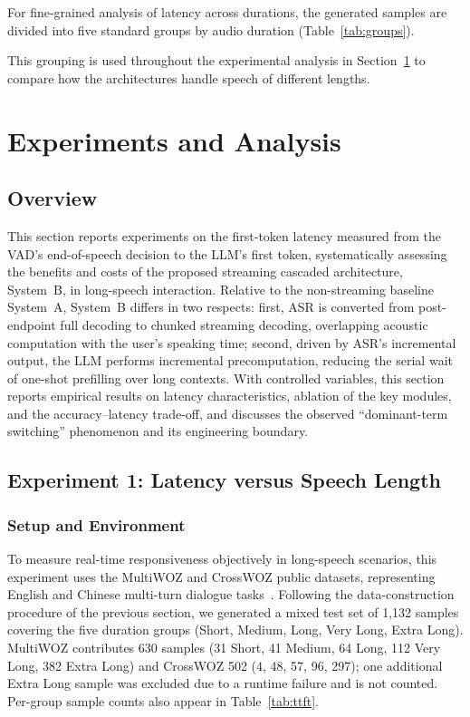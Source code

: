 \documentclass[pdflatex,iicol,Numbered,sn-basic]{sn-jnl}%
\begin{document}
For fine-grained analysis of latency across durations, the generated samples are divided into five standard groups by audio duration (Table~\ref{tab:groups}).

This grouping is used throughout the experimental analysis in Section~\ref{sec:experiments} to compare how the architectures handle speech of different lengths.

\section{Experiments and Analysis}\label{sec:experiments}

\subsection{Overview}

This section reports experiments on the first-token latency measured from the VAD's end-of-speech decision to the LLM's first token, systematically assessing the benefits and costs of the proposed streaming cascaded architecture, System~B, in long-speech interaction. Relative to the non-streaming baseline System~A, System~B differs in two respects: first, ASR is converted from post-endpoint full decoding to chunked streaming decoding, overlapping acoustic computation with the user's speaking time; second, driven by ASR's incremental output, the LLM performs incremental precomputation, reducing the serial wait of one-shot prefilling over long contexts. With controlled variables, this section reports empirical results on latency characteristics, ablation of the key modules, and the accuracy--latency trade-off, and discusses the observed ``dominant-term switching'' phenomenon and its engineering boundary.

\subsection{Experiment 1: Latency versus Speech Length}

\subsubsection{Setup and Environment}

To measure real-time responsiveness objectively in long-speech scenarios, this experiment uses the MultiWOZ and CrossWOZ public datasets, representing English and Chinese multi-turn dialogue tasks~\cite{ref18,ref19}. Following the data-construction procedure of the previous section, we generated a mixed test set of 1,132 samples covering the five duration groups (Short, Medium, Long, Very Long, Extra Long). MultiWOZ contributes 630 samples (31 Short, 41 Medium, 64 Long, 112 Very Long, 382 Extra Long) and CrossWOZ 502 (4, 48, 57, 96, 297); one additional Extra Long sample was excluded due to a runtime failure and is not counted. Per-group sample counts also appear in Table~\ref{tab:ttft}.
\end{document}
